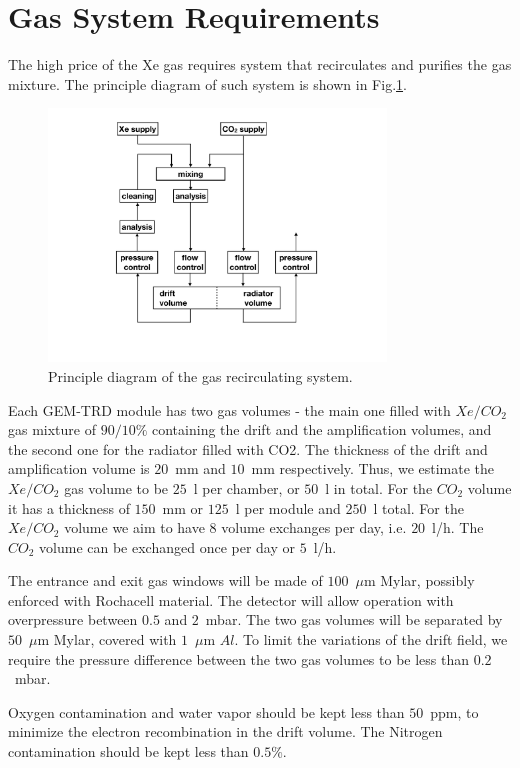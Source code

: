 \documentclass[%
preprint,
nofootinbib,
 amsmath,amssymb,
 aps,
floatfix,
]{revtex4-1}
\begin{document}
\section{Gas System Requirements}
The high price of the Xe gas requires system that recirculates
and purifies the gas mixture.
The principle diagram of such system is shown in Fig.\ref{fig:gas}.
\begin{figure}[]
\includegraphics[width=0.80\textwidth]{./fig/TRD_gas_diagram-2175.pdf}
  \caption{
Principle diagram of the gas recirculating system.
}
  \label{fig:gas}
\end{figure}
Each GEM-TRD module has two gas volumes - 
the main one filled with $Xe/CO_2$ gas mixture of $90/10\%$ 
containing the drift and the amplification volumes,
and the second one for the radiator filled with CO2. 
The thickness of the drift and amplification volume is $20$~mm and $10$~mm respectively.
Thus, we estimate the $Xe/CO_2$ gas volume to be $25$~l per chamber, or $50$~l in total.
For the $CO_2$ volume it has a thickness of $150$~mm or $125$~l per module and $250$~l total.
For the $Xe/CO_2$ volume we aim to have 8 volume exchanges per day, i.e. $20$~l/h.
The $CO_2$ volume can be exchanged once  per day or $5$~l/h.

The entrance and exit gas windows will be made of $100$~$\mu$m Mylar, possibly enforced with Rochacell
material.
The detector will allow operation with overpressure between $0.5$ and $2$~mbar.
The two gas volumes will be separated by $50$~$\mu$m Mylar, covered with $1$~$\mu$m $Al$.
To limit the variations of the drift field, we require the pressure difference between the two gas
volumes to be less than $0.2$~mbar. 

Oxygen contamination and water vapor should be kept less than $50$~ppm, 
to minimize the electron recombination 
in the drift volume. The Nitrogen contamination should be kept less than $0.5\%$.
\end{document}
